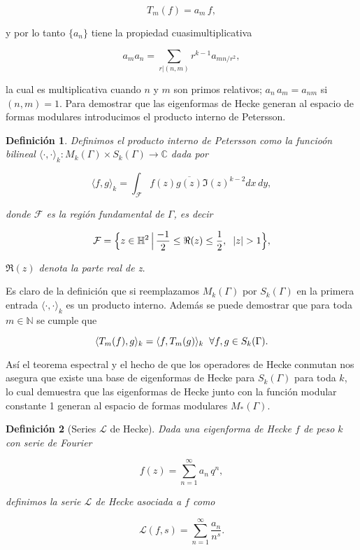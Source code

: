 \documentclass[letterpaper]{report}
\newtheorem{def.}{Definici\'on}[chapter]
\newcommand{\nat}{\ensuremath{ \mathbb N }}
\newcommand{\co}{\ensuremath{\mathbb C }}
\newcommand{\hd}{\ensuremath{\mathbb{H}^{2}}}
\newcommand{\ga}{\ensuremath{\Gamma}}
\newcommand{\modk}{\ensuremath{M_k(\Gamma)}}
\begin{document}
$$T_m(f)= a_m\,f,$$

\noindent y por lo tanto $\lbrace a_n\rbrace$ tiene la propiedad cuasimultiplicativa 

$$a_m a_n = \sum_{r\vert(n,m)}r^{k-1}a_{mn/r^2},$$

\noindent la cual es multiplicativa cuando $n$ y $m$ son primos relativos; $a_n\,a_m=a_{nm}$ si $(n,m)=1$. Para demostrar que las eigenformas de Hecke generan al espacio de formas modulares introducimos el producto interno de Petersson.

\begin{def.}\label{petersson}
Definimos el producto interno de Petersson como la funcioón bilineal $\langle\cdot ,\cdot\rangle_k:\modk\times S_k(\ga)\rightarrow\co$ dada por

\begin{equation}
\langle f , g\rangle_k = \int_{\mathcal{F}}f(z)\overline{g(z)}\Im(z)^{k-2}dx\,dy,
\end{equation} 

donde $\mathcal{F}$ es la región fundamental de $\ga$, es decir

$$\mathcal{F}=\Big\lbrace z\in\hd\,\Big\vert\,\frac{-1}{2}\leq\Re(z)\leq\frac{1}{2},\hspace{0.2cm}\vert z\vert > 1\Big\rbrace,$$

$\Re(z)$ denota la parte real de z.
\end{def.}

Es claro de la definición que si reemplazamos $\modk$ por $S_k(\ga)$ en la primera entrada $\langle\cdot ,\cdot\rangle_k$ es un producto interno. Además se puede demostrar que para toda $m\in\nat$ se cumple que

$$\langle T_m(f),g\rangle_k=\langle f,T_m(g)\rangle_k\hspace{0.2cm}\forall f,g\in S_k(\ga).$$

Así el teorema espectral y el hecho de que los operadores de Hecke conmutan nos asegura que existe una base de eigenformas de Hecke para $S_k(\ga)$ para toda $k$, lo cual demuestra que las eigenformas de Hecke junto con la función modular constante 1 generan al espacio de formas modulares $M_{\ast}(\ga)$.

\begin{def.}[Series $\mathcal{L}$ de Hecke]\label{hecke-l}
Dada una eigenforma de Hecke $f$ de peso $k$ con serie de Fourier 

$$f(z) = \sum_{n=1}^{\infty}a_n\,q^n,$$

definimos la serie $\mathcal{L}$ de Hecke asociada a $f$ como

\begin{equation}
\mathcal{L}(f,s)=\sum_{n=1}^{\infty}\frac{a_n}{n^s}.
\end{equation}
\end{def.}
\end{document}
